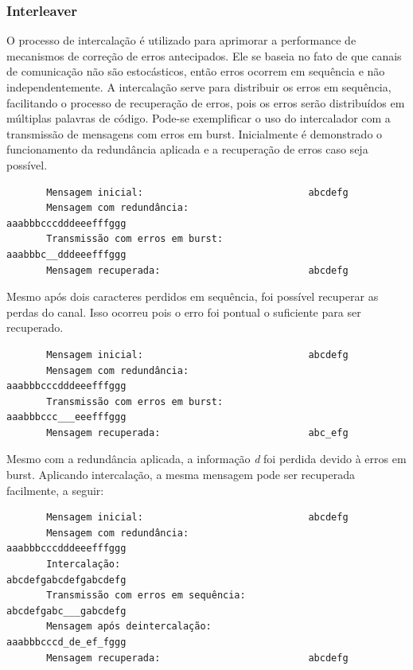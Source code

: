 	\subsubsection{Interleaver}
	
	O processo de intercalação é utilizado para aprimorar a performance de mecanismos de correção de erros antecipados. Ele se baseia no fato de que canais de comunicação não são estocásticos, então erros ocorrem em sequência e não independentemente. A intercalação serve para distribuir os erros em sequência, facilitando o processo de recuperação de erros, pois os erros serão distribuídos em múltiplas palavras de código. Pode-se exemplificar o uso do intercalador com a transmissão de mensagens com erros em burst. Inicialmente é demonstrado o funcionamento da redundância aplicada e a recuperação de erros caso seja possível.

	\begin{verbatim}
	   Mensagem inicial:                             abcdefg
	   Mensagem com redundância:                     aaabbbcccdddeeefffggg
	   Transmissão com erros em burst:               aaabbbc__dddeeefffggg
	   Mensagem recuperada:                          abcdefg
	\end{verbatim}

	Mesmo após dois caracteres perdidos em sequência, foi possível recuperar as perdas do canal. Isso ocorreu pois o erro foi pontual o suficiente para ser recuperado.
	
	\begin{verbatim}
	   Mensagem inicial:                             abcdefg
	   Mensagem com redundância:                     aaabbbcccdddeeefffggg
	   Transmissão com erros em burst:               aaabbbccc___eeefffggg
	   Mensagem recuperada:                          abc_efg
	\end{verbatim}
	
	Mesmo com a redundância aplicada, a informação \textit{d} foi perdida devido à erros em burst. Aplicando intercalação, a mesma mensagem pode ser recuperada facilmente, a seguir:
	
	\begin{verbatim}
	   Mensagem inicial:                             abcdefg
	   Mensagem com redundância:                     aaabbbcccdddeeefffggg
	   Intercalação:                                 abcdefgabcdefgabcdefg
	   Transmissão com erros em sequência:           abcdefgabc___gabcdefg
	   Mensagem após deintercalação:                 aaabbbcccd_de_ef_fggg
	   Mensagem recuperada:                          abcdefg
	\end{verbatim}
	
